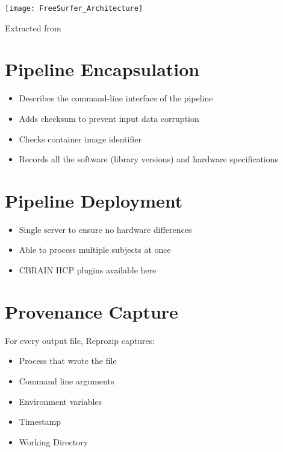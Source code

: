 \begin{center}
  \texttt{[image: FreeSurfer\_Architecture]}
  \label{fig:freesurfer_overview}
  \caption*{Extracted from \cite{Gla13}}
\end{center}

\section{Pipeline Encapsulation}

\begin{itemize}
  \item Describes the command-line interface of the pipeline
  \item Adds checksum to prevent input data corruption
  \item Checks container image identifier
  \item Records all the software (library versions) and hardware specifications
\end{itemize}

\section{Pipeline Deployment}

\begin{itemize}
  \item Single server to ensure no hardware differences
  \item Able to process multiple subjects at once
  \item CBRAIN HCP plugins available here
\end{itemize}

\section{Provenance Capture}

\begin{flushleft}
For every output file, Reprozip captures: 
\end{flushleft}

\begin{itemize}
  \item Process that wrote the file
  \item Command line arguments
  \item Environment variables
  \item Timestamp
  \item Working Directory
\end{itemize}

